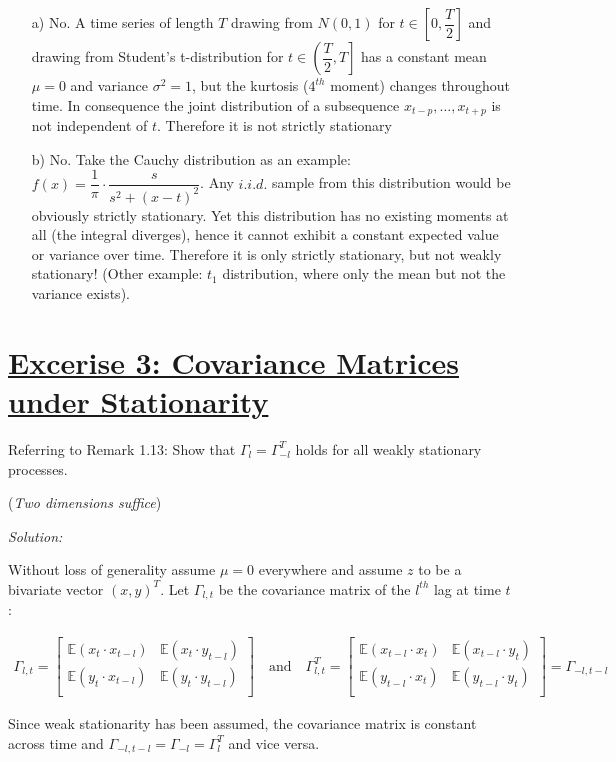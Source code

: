 \documentclass[12pt,a4paper]{article}
\newcommand{\tmpsection}[1]{}
\let\tmpsection=\section
\renewcommand{\section}[1]{\tmpsection{\underline{#1}} }
\begin{document}
\begin{itemize}
    \item[a)] No. A time series of length $T$ drawing from $N(0, 1)$ for $t \in \left[0, \dfrac{T}{2} \right]$ and drawing from Student’s t-distribution for $t \in \left(\dfrac{T}{2}, T \right]$ has a constant mean $\mu = 0$ and variance $\sigma^2 = 1$, but the kurtosis ($4^{th}$ moment) changes throughout time. In consequence the joint distribution of a subsequence $x_{t-p}, \ldots , x_{t+p}$ is not independent of $t$. Therefore it is not strictly stationary
    \item[b)] No. Take the Cauchy distribution as an example: $f(x) = \dfrac{1}{\pi} \cdot \dfrac{s}{s^2 + (x -t)^2}$. Any $i.i.d.$ sample from this distribution would be obviously strictly stationary. Yet this distribution has no existing moments at all (the integral diverges), hence it cannot exhibit a constant expected value or variance over time. Therefore it is only strictly stationary, but not weakly stationary! (Other example: $t_1$ distribution, where only the mean but not the variance exists).
\end{itemize}

\hypertarget{excerise-3-covariance-matrices-under-stationarity}{%
\section{Excerise 3: Covariance Matrices under
Stationarity}\label{excerise-3-covariance-matrices-under-stationarity}}

Referring to Remark 1.13: Show that \(\Gamma_l = \Gamma^{T}_{-l}\) holds
for all weakly stationary processes.

(\emph{Two dimensions suffice})

\emph{Solution:}

Without loss of generality assume \(\mu = 0\) everywhere and assume
\(z\) to be a bivariate vector \((x,y)^T\). Let \(\Gamma_{l,t}\) be the
covariance matrix of the \(l^{th}\) lag at time \(t\):

\begin{align*}
\Gamma_{l,t} = 
\begin{bmatrix}
  \mathbb{E}(x_t \cdot x_{t-l}) & \mathbb{E}(x_t \cdot y_{t-l}) \\
  \mathbb{E}(y_t \cdot x_{t-l}) & \mathbb{E}(y_t \cdot y_{t-l}) \\
\end{bmatrix}
\quad \text{and} \quad 
\Gamma_{l,t}^{T} = 
\begin{bmatrix}
  \mathbb{E}(x_{t-l} \cdot x_t ) & \mathbb{E}(x_{t-l} \cdot y_t) \\
  \mathbb{E}(y_{t-l} \cdot x_t  ) & \mathbb{E}( y_{t-l} \cdot y_t) \\
\end{bmatrix}
= \Gamma_{-l, t- l}
\end{align*}

Since weak stationarity has been assumed, the covariance matrix is
constant across time and
\(\Gamma_{-l, t- l} = \Gamma_{-l} = \Gamma_{l}^{T}\) and vice versa.
\end{document}
